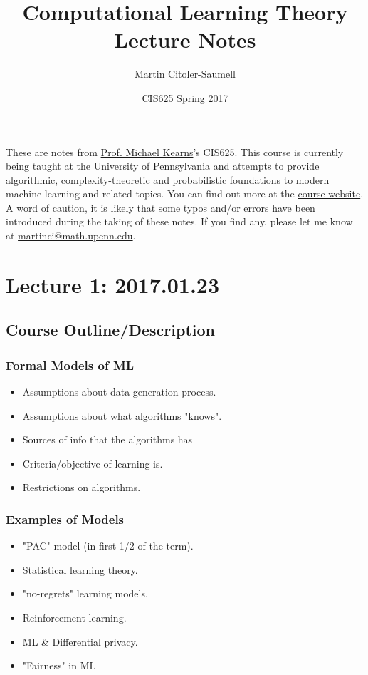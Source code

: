 \documentclass[12pt, letterpaper]{article}
\title{Computational Learning Theory Lecture Notes}
\author{Martin Citoler-Saumell}
\date{CIS625 Spring 2017}
\numberwithin{equation}{section} %
\theoremstyle{definition}
\theoremstyle{remark}
\begin{document}
\maketitle

These are notes from \href{http://www.cis.upenn.edu/~mkearns/}{Prof. Michael Kearns}'s CIS625. This course is currently being taught at the University of Pennsylvania and attempts to provide algorithmic, complexity-theoretic and probabilistic foundations to modern machine learning and related topics. You can find out more at the \href{http://www.cis.upenn.edu/~mkearns/teaching/COLT/}{course website}. A word of caution, it is likely that some typos and/or errors have been introduced during the taking of these notes. If you find any, please let me know at \href{mailto:martinci@math.upenn.edu}{martinci@math.upenn.edu}.

\section{Lecture 1: 2017.01.23}

\subsection{Course Outline/Description}

\subsubsection{Formal Models of ML}

\begin{itemize}
	\item Assumptions about data generation process.
	\item Assumptions about what algorithms "knows".
	\item Sources of info that the algorithms has
	\item Criteria/objective of learning is.
	\item Restrictions on algorithms.
\end{itemize}
	
\subsubsection{Examples of Models}

\begin{itemize}
	\item "PAC" model (in first 1/2 of the term).
	\item Statistical learning theory.
	\item "no-regrets" learning models.
	\item Reinforcement learning.
	\item ML \& Differential privacy.
	\item "Fairness" in ML
\end{itemize}
\end{document}
